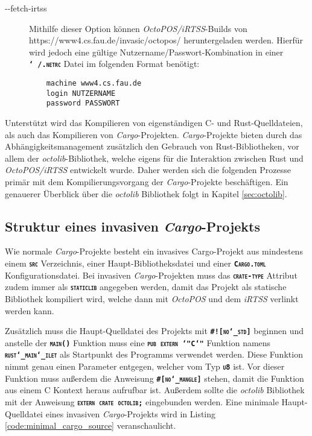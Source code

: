 \begin{description}
	\item[-{}-fetch-irtss]
	Mithilfe dieser Option können \textit{OctoPOS/iRTSS}-Builds von \\
	https://www4.cs.fau.de/invasic/octopos/ heruntergeladen werden. Hierfür wird jedoch
	eine gültige Nutzername/Passwort-Kombination in einer \texttt{\textsc{\textbf{\char`~/.netrc}}}
	Datei im folgenden Format benötigt:
	\begin{verbatim}
	machine www4.cs.fau.de
	login NUTZERNAME
	password PASSWORT
	\end{verbatim}
\end{description}

Unterstützt wird das Kompilieren von eigenständigen C- und Rust-Quelldateien, als auch das Kompilieren von
\textit{Cargo}-Projekten. \textit{Cargo}-Projekte bieten durch das Abhängigkeitsmanagement zusätzlich den Gebrauch
von Rust-Bibliotheken, vor allem der \textit{octolib}-Bibliothek,
welche eigens für die Interaktion zwischen Rust und \textit{OctoPOS/iRTSS}
entwickelt wurde.
Daher werden sich die folgenden Prozesse primär mit dem Kompilierungsvorgang der \textit{Cargo}-Projekte
beschäftigen.
Ein genauerer Überblick über die \textit{octolib} Bibliothek folgt in Kapitel \ref{sec:octolib}.

\subsection{Struktur eines invasiven \textit{Cargo}-Projekts}

Wie normale \textit{Cargo}-Projekte besteht ein invasives Cargo-Projekt aus mindestens einem
\texttt{\textsc{\textbf{src}}} Verzeichnis, einer Haupt-Bibliotheksdatei
und einer \texttt{\textsc{\textbf{Cargo.toml}}} Konfigurationsdatei.
Bei invasiven \textit{Cargo}-Projekten muss das \texttt{\textsc{\textbf{crate-type}}} Attribut zudem immer als
\texttt{\textsc{\textbf{staticlib}}} angegeben werden,
damit das Projekt als statische Bibliothek kompiliert wird, welche dann mit \textit{OctoPOS} und dem \textit{iRTSS} 
verlinkt werden kann.

Zusätzlich muss die Haupt-Quelldatei des Projekts mit \texttt{\textsc{\textbf{\#![no\char`_std]}}} beginnen und 
anstelle der \texttt{\textsc{\textbf{main()}}} Funktion muss eine
\texttt{\textsc{\textbf{pub extern \char`"C\char`"}}} Funktion namens \\
\texttt{\textsc{\textbf{rust\char`_main\char`_ilet}}} als Startpunkt des Programms verwendet werden.
Diese Funktion nimmt genau einen Parameter entgegen, welcher vom Typ \texttt{\textsc{\textbf{u8}}} ist.
Vor dieser Funktion muss außerdem die Anweisung \texttt{\textsc{\textbf{\#[no\char`_mangle]}}} stehen,
damit die Funktion aus einem C Kontext heraus aufrufbar ist.
Außerdem sollte die \textit{octolib} Bibliothek mit der Anweisung \texttt{\textsc{\textbf{extern crate octolib;}}}
eingebunden werden. Eine minimale Haupt-Quelldatei eines invasiven \textit{Cargo}-Projekts wird in Listing
\ref{code:minimal_cargo_source} veranschaulicht.

